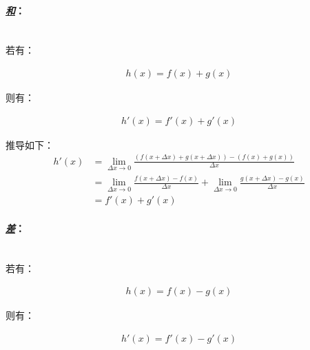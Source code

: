 \paragraph{\textbf{\emph{\underline{和}}}：}

\quad \\

若有：

\begin{equation*}
\begin{aligned}
h(x) = f(x) + g(x)
\end{aligned}
\end{equation*}

则有：

\begin{equation*}
\begin{aligned}
h'(x) = f'(x) + g'(x)
\end{aligned}
\end{equation*}

推导如下：\\

\begin{equation*}
\begin{aligned}
h'(x) & = \lim_{\Delta x \to 0}\frac{(f(x + \Delta x) + g(x + \Delta x)) - (f(x) + g(x))}{\Delta x}\\
& = \lim_{\Delta x \to 0}\frac{f(x + \Delta x) - f(x)}{\Delta x} + \lim_{\Delta x \to 0}\frac{g(x + \Delta x) - g(x)}{\Delta x}\\
& = f'(x) + g'(x)
\end{aligned}
\end{equation*}

\paragraph{\textbf{\emph{\underline{差}}}：}

\quad \\

若有：

\begin{equation*}
\begin{aligned}
h(x) = f(x) - g(x)
\end{aligned}
\end{equation*}

则有：

\begin{equation*}
\begin{aligned}
h'(x) = f'(x) - g'(x)
\end{aligned}
\end{equation*}


